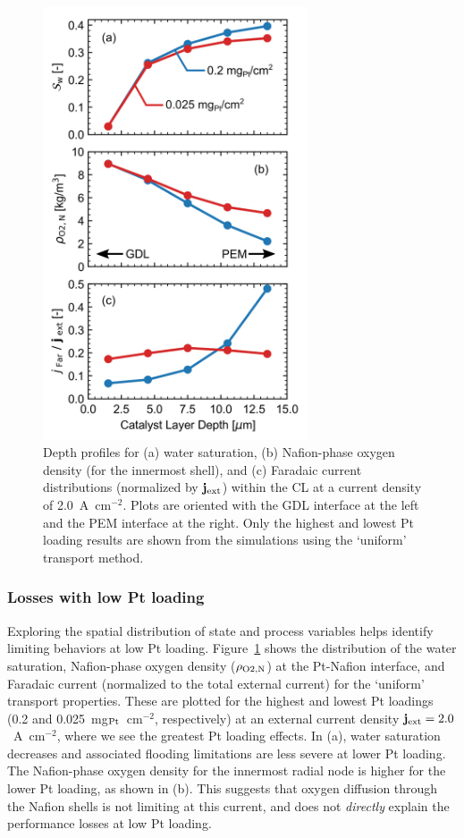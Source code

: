 \documentclass[final,3p,times,twocolumn]{elsarticle}    %
\newcommand{\crr}[1]{\color{red} #1 \color{black}}
\begin{document}
\begin{figure}[!tb]
    \centering
    \includegraphics[width=3.07in]{figures_uniform/cause-of-losses-vert-3_07in.png}
    \crr{
    \caption{Depth profiles for (a) water saturation, (b) Nafion-phase oxygen density (for the innermost shell), and (c) Faradaic current distributions (normalized by ${\bf j}_{\rm ext}$) within the CL at a current density of 2.0~A~cm$^{-2}$. Plots are oriented with the GDL interface at the left and the PEM interface at the right. Only the highest and lowest Pt loading results are shown from the simulations using the `uniform' transport method.}}
    \label{fig:cause-of-losses}
\end{figure}

\subsubsection{Losses with low Pt loading}
\label{sect:cause-of-losses}
Exploring the spatial distribution of state and process variables helps identify limiting behaviors at low Pt loading. Figure~\ref{fig:cause-of-losses} shows the distribution of the water saturation, Nafion-phase oxygen density ($\rho_{\rm O2,N}$) at the Pt-Nafion interface, and Faradaic current (normalized to the total external current) for the \crr{`uniform'} transport \crr{properties.} These are plotted for the highest and lowest Pt loadings (0.2 and 0.025~mg$_{\rm Pt}$~cm$^{-2}$, respectively) at an external current density ${\bf j}_{\rm ext} = 2.0$~A~cm$^{-2}$, where we see the greatest Pt loading effects. In (a), water saturation decreases and associated flooding limitations are less severe at lower Pt loading. The Nafion-phase oxygen density for the innermost radial node is higher for the lower Pt loading, as shown in (b). This suggests that oxygen diffusion through the Nafion shells is not limiting at this current, and does not \emph{directly} explain the performance losses at low Pt loading. 
\end{document}
